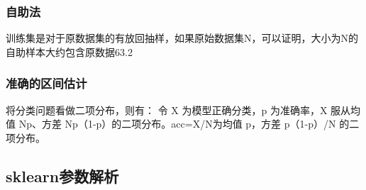 \documentclass[18pt,a4paper,oneside,UTF8]{ctexart}
\begin{document}
\subsubsection{自助法}
训练集是对于原数据集的有放回抽样，如果原始数据集N，可以证明，大小为N的自助样本大约包含原数据63.2%
\subsubsection{准确的区间估计}
将分类问题看做二项分布，则有：
令 X 为模型正确分类，p 为准确率，X 服从均值 Np、方差 Np（1-p）的二项分布。acc=X/N为均值 p，方差 p（1-p）/N 的二项分布。
\subsection{sklearn参数解析}
\end{document}
